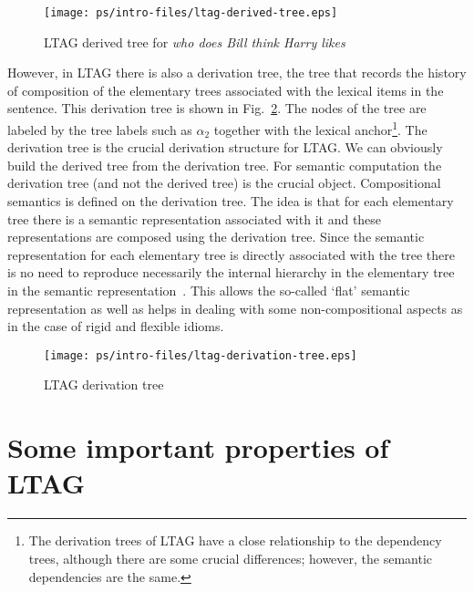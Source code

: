 \begin{figure*}[ht] 
\begin{center}
\texttt{[image: ps/intro-files/ltag-derived-tree.eps]}
\caption{\label{derived-tree} LTAG derived tree for {\it who does Bill think Harry likes}}
\end{center}
\end{figure*}


However, in LTAG there is also a derivation tree, the tree that
records the history of composition of the elementary trees associated
with the lexical items in the sentence. This derivation tree is shown
in Fig.~\ref{ltag-derivation-tree}. The nodes of the tree are labeled
by the tree labels such as $\alpha_2$ together with the lexical
anchor\footnote{The derivation trees of LTAG have a close relationship
to the dependency trees, although there are some crucial differences;
however, the semantic dependencies are the same.}.  The derivation
tree is the crucial derivation structure for LTAG. We can obviously
build the derived tree from the derivation tree. For semantic
computation the derivation tree (and not the derived tree) is the
crucial object. Compositional semantics is defined on the derivation
tree. The idea is that for each elementary tree there is a semantic
representation associated with it and these representations are
composed using the derivation tree. Since the semantic representation
for each elementary tree is directly associated with the tree there is
no need to reproduce necessarily the internal hierarchy in the
elementary tree in the semantic
representation~\cite{joshi99:_compos_ltag}. This allows the so-called
`flat' semantic representation as well as helps in dealing with some
non-compositional aspects as in the case of rigid and flexible idioms.


\begin{figure*}[ht] 
\begin{center}
\texttt{[image: ps/intro-files/ltag-derivation-tree.eps]}
\caption{\label{ltag-derivation-tree} LTAG derivation tree}
\end{center}
\end{figure*}

\section{Some important properties of LTAG}

